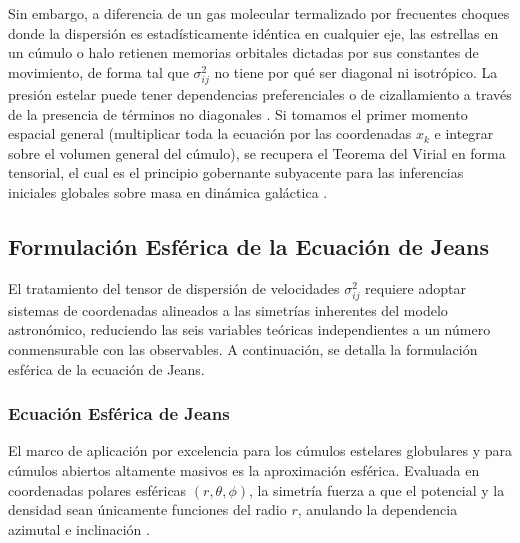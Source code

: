                 Sin embargo, a diferencia de un gas molecular termalizado por 
                frecuentes choques donde la dispersión es estadísticamente 
                idéntica en cualquier eje, las estrellas en un cúmulo o halo 
                retienen memorias orbitales dictadas por sus constantes de 
                movimiento, de forma tal que $\sigma_{ij}^2$ no tiene por qué 
                ser diagonal ni isotrópico. La presión estelar puede tener 
                dependencias preferenciales o de cizallamiento a través de la 
                presencia de términos no diagonales \cite{binney_tremaine_2008}. 
                Si tomamos el primer momento espacial general (multiplicar toda 
                la ecuación por las coordenadas $x_k$ e integrar sobre el 
                volumen general del cúmulo), se recupera el Teorema del Virial 
                en forma tensorial, el cual es el principio gobernante 
                subyacente para las inferencias iniciales globales sobre masa en 
                dinámica galáctica \cite{binney_tremaine_2008}.

        \subsection{Formulación Esférica de la Ecuación de Jeans}
                El tratamiento del tensor de dispersión de velocidades 
                $\sigma_{ij}^2$ requiere adoptar sistemas de coordenadas 
                alineados a las simetrías inherentes del modelo astronómico, 
                reduciendo las seis variables teóricas independientes a un 
                número conmensurable con las observables. A continuación, se 
                detalla la formulación esférica de la ecuación de Jeans.

                \subsubsection{Ecuación Esférica de Jeans}
                    El marco de aplicación por excelencia para los cúmulos 
                    estelares globulares y para cúmulos abiertos altamente 
                    masivos es la aproximación esférica. Evaluada en coordenadas 
                    polares esféricas $(r, \theta, \phi)$, la simetría fuerza a 
                    que el potencial y la densidad sean únicamente funciones del 
                    radio $r$, anulando la dependencia azimutal e inclinación 
                    \cite{mamon2010kinematic}.

